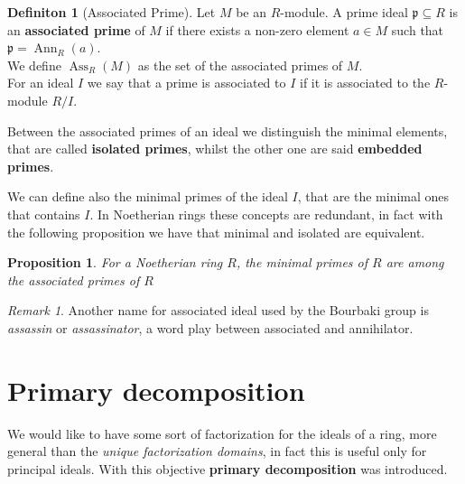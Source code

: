 \documentclass[notitlepage, a4]{book}
\theoremstyle{plain}
\newtheorem{prop}[teo]{Proposition}
\theoremstyle{remark}
\newtheorem{rem}{Remark}
\theoremstyle{definition}
\newtheorem{deff}[teo]{Definiton}
\newcommand{\p}{\mathfrak{p}}
\DeclareMathOperator{\Ann}{Ann}
\DeclareMathOperator{\Ass}{Ass}
\newcounter{que}
\begin{document}
\begin{deff}[Associated Prime]
Let $ M $ be an $ R $-module. A prime ideal $ \p \subseteq R $ is an \textbf{associated prime} of $ M $ if there exists a non-zero element $ a \in M $ such that $ \p = \Ann_R (a)$. \\
We define $ \Ass_R(M) $ as the set of the associated primes of $ M $.\\
For an ideal $ I $ we say that a prime is associated to $ I $ if it is associated to the $ R $-module $ R/I $.
\end{deff}

Between the associated primes of an ideal we distinguish the minimal elements, that are called \textbf{isolated primes}, whilst the other one are said \textbf{embedded primes}.

We can define also the minimal primes of the ideal $ I $, that are the minimal ones that contains $ I $. In Noetherian rings these concepts are redundant, in fact with the following proposition we have that minimal and isolated are equivalent. 

\begin{prop} \label{prop:minprimes}
	For a Noetherian ring $ R$, the minimal primes of $ R $ are among the associated primes of $ R $
\end{prop}

%
%

\begin{rem}
	Another name for associated ideal used by the Bourbaki group is \textit{assassin} or \textit{assassinator}, a word play between associated and annihilator. %
\end{rem}

\section{Primary decomposition}

We would like to have some sort of factorization for the ideals of a ring, more general than the \textit{unique factorization domains}, in fact this is useful only for principal ideals. With this objective \textbf{primary decomposition} was introduced. 
\end{document}
